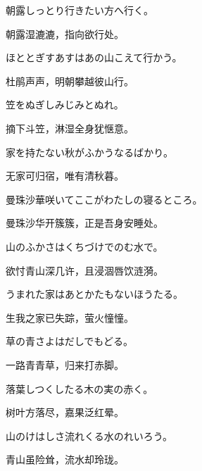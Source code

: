 \begin{haiku}
    {\FH 朝露しっとり行きたい方へ行く。}

    {\FK 朝露湿漉漉，指向欲行处。}
\end{haiku}

\begin{haiku}
    {\FH ほととぎすあすはあの山こえて行かう。}

    {\FK 杜鹃声声，明朝攀越彼山行。}
\end{haiku}

\begin{haiku}
    {\FH 笠をぬぎしみじみとぬれ。}

    {\FK 摘下斗笠，淋湿全身犹惬意。}
\end{haiku}

\begin{haiku}
    {\FH 家を持たない秋がふかうなるばかり。}

    {\FK 无家可归宿，唯有清秋暮。}
\end{haiku}

\begin{haiku}
    {\FH 曼珠沙華咲いてここがわたしの寝るところ。}

    {\FK 曼珠沙华开簇簇，正是吾身安睡处。}
\end{haiku}

\begin{haiku}
    {\FH 山のふかさはくちづけでのむ水で。}

    {\FK 欲忖青山深几许，且浸涸唇饮涟漪。}
\end{haiku}

\begin{haiku}
    {\FH うまれた家はあとかたもないほうたる。}

    {\FK 生我之家已失踪，萤火憧憧。}
\end{haiku}

\begin{haiku}
    {\FH 草の青さよはだしでもどる。}

    {\FK 一路青青草，归来打赤脚。}
\end{haiku}

\begin{haiku}
    {\FH 落葉しつくしたる木の実の赤く。}

    {\FK 树叶方落尽，嘉果泛红晕。}
\end{haiku}

\begin{haiku}
    {\FH 山のけはしさ流れくる水のれいろう。}

    {\FK 青山虽险耸，流水却玲珑。}
\end{haiku}

